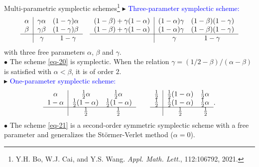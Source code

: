 \documentclass[10pt]{beamer}
\begin{document}
\begin{frame}{Multi-parametric symplectic schemes\footnote{Y.H. Bo, W.J. Cai, and Y.S. Wang. {\em Appl. Math. Lett.}, 112:106792, 2021.}}
\textcolor[rgb]{0,0,1}{$\blacktriangleright$} \textcolor{blue}{Three-parameter symplectic scheme:}
\begin{equation}\label{eq-20}
\begin{tabular}{c|c}
$\alpha$ & $\gamma\alpha$\quad $(1-\gamma)\alpha$\\ 
$\beta$ & $\gamma\beta$\quad $(1-\gamma)\beta$\\ \hline
& $\gamma$\quad\quad\ $1-\gamma$\\
\end{tabular}\quad
\begin{tabular}{c|c}
$(1-\beta)+\gamma(1-\alpha)$ & $(1-\alpha)\gamma$\quad $(1-\beta)(1-\gamma)$\\ 
$(1-\beta)+\gamma(1-\alpha)$ & $(1-\alpha)\gamma$\quad $(1-\beta)(1-\gamma)$\\ \hline
& $\gamma$\quad\quad\quad\quad$1-\gamma$\\
\end{tabular}
\end{equation}
with three free parameters $\alpha$, $\beta$ and $\gamma$.\\
\vspace{2mm}
\quad\textcolor[rgb]{0,0,1}{$\bullet$} The scheme \eqref{eq-20} is symplectic. When the relation $\gamma=(1/2-\beta)/(\alpha-\beta)$ is satisfied with $\alpha<\beta$, it is of order $2$.\\
\vspace{2mm}
\textcolor[rgb]{0,0,1}{$\blacktriangleright$} \textcolor{blue}{One-parameter symplectic scheme:}
\begin{equation}\label{eq-21}
\begin{tabular}{c|c}
$\alpha$ & $\frac{1}{2}\alpha$\quad\quad\quad\  $\frac{1}{2}\alpha$\\ 
$1-\alpha$ & $\frac{1}{2}(1-\alpha)$\quad $\frac{1}{2}(1-\alpha)$\\ \hline
& $\frac{1}{2}$\quad\quad\quad\quad $\frac{1}{2}$\\
\end{tabular}\quad\quad
\begin{tabular}{c|c c}
$\frac{1}{2}$ & $\frac{1}{2}(1-\alpha)$\quad $\frac{1}{2}\alpha$\\ 
$\frac{1}{2}$ & $\frac{1}{2}(1-\alpha)$\quad $\frac{1}{2}\alpha$\\ \hline
&~~~~$\frac{1}{2}$\quad\quad\quad$\frac{1}{2}$\\
\end{tabular}.
\end{equation}
\quad\textcolor[rgb]{0,0,1}{$\bullet$} The scheme \eqref{eq-21} is a second-order symmetric symplectic scheme with a free parameter and generalizes the St\"{o}rmer-Verlet method ($\alpha=0$).
\end{frame}
\end{document}
